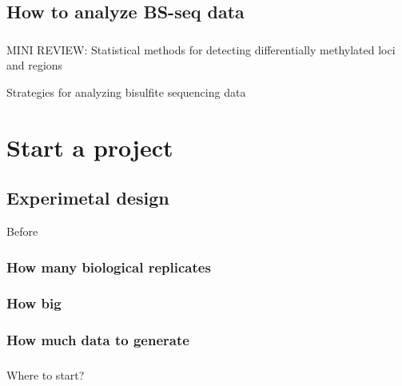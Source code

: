 \documentclass[]{book}
\begin{document}
\hypertarget{how-to-analyze-bs-seq-data}{%
\section{How to analyze BS-seq data}\label{how-to-analyze-bs-seq-data}}

\hypertarget{section-5}{%
\subsection{}\label{section-5}}

MINI REVIEW: Statistical methods for detecting differentially methylated loci and regions

Strategies for analyzing bisulfite sequencing data

\hypertarget{start-a-project}{%
\chapter{Start a project}\label{start-a-project}}

\hypertarget{experimetal-design}{%
\section{Experimetal design}\label{experimetal-design}}

Before

\hypertarget{how-many-biological-replicates}{%
\subsection{How many biological replicates}\label{how-many-biological-replicates}}

\hypertarget{how-big}{%
\subsection{How big}\label{how-big}}

\hypertarget{how-much-data-to-generate}{%
\subsection{How much data to generate}\label{how-much-data-to-generate}}

\hypertarget{section-6}{%
\subsection{}\label{section-6}}

Where to start?
\end{document}
